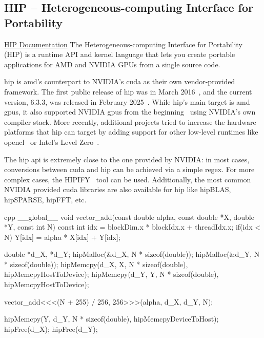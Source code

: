 \subsection{HIP -- Heterogeneous-computing Interface for Portability}
\label{sec:frameworks:hip}

\begin{quotebox}{\href{https://rocm.docs.amd.com/projects/HIP/en/latest/index.html\#hip-documentation}{HIP Documentation}}
    The Heterogeneous-computing Interface for Portability (HIP) is a \cpp runtime API and kernel language that lets you create portable applications for AMD and NVIDIA GPUs from a single source code.
\end{quotebox}

\acrfull{hip} is \gls{amd}'s counterpart to NVIDIA's \gls{cuda} as their own vendor-provided framework. 
The first public release of \gls{hip} was in March 2016~\cite{advanced_micro_devices_release_2016}, and the current version, 6.3.3, was released in February 2025~\cite{advanced_micro_devices_release_2025}. 
While \gls{hip}'s main target is \gls{amd} \glspl{gpu}, it also supported NVIDIA \glspl{gpu} from the beginning~\cite{advanced_micro_devices_its_2016} using NVIDIA's own compiler stack.
More recently, additional projects tried to increase the hardware platforms that \gls{hip} can target by adding support for other low-level runtimes like \gls{opencl}~\cite{babej_hipcl_2020} or Intel's Level Zero~\cite{singer_hiplz_2023}.

The \gls{hip} \gls{api} is extremely close to the one provided by NVIDIA: in most cases, conversions between \gls{cuda} and \gls{hip} can be achieved via a simple regex. 
For more complex cases, the HIPIFY~\cite{advanced_micro_devices_rocmhipify_2025} tool can be used. 
Additionally, the most common NVIDIA provided \gls{cuda} libraries are also available for \gls{hip} like hipBLAS, hipSPARSE, hipFFT, etc.

\begin{listing}
    \begin{moderncode}{cpp}
__global__ void vector_add(const double alpha, const double *X, double *Y, const int N) {
    const int idx = blockDim.x * blockIdx.x + threadIdx.x;
    if(idx < N) Y[idx] = alpha * X[idx] + Y[idx];
}
    
double *d_X, *d_Y;
hipMalloc(&d_X, N * sizeof(double));
hipMalloc(&d_Y, N * sizeof(double));
hipMemcpy(d_X, X, N * sizeof(double), hipMemcpyHostToDevice);
hipMemcpy(d_Y, Y, N * sizeof(double), hipMemcpyHostToDevice);

vector_add<<<(N + 255) / 256, 256>>>(alpha, d_X, d_Y, N);

hipMemcpy(Y, d_Y, N * sizeof(double), hipMemcpyDeviceToHost);
hipFree(d_X);
hipFree(d_Y);
    \end{moderncode}
    \caption{%
    A simple DAXPY example using \gls{hip} including all necessary memory and kernel launch operations.
    }
    \label{code:hip_example}
\end{listing}

